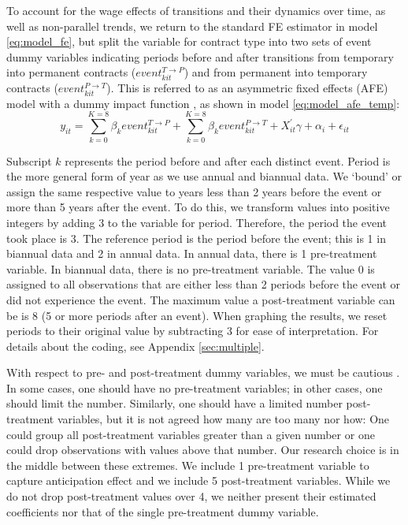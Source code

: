 \documentclass[12pt]{article}
\begin{document}
To account for the wage effects of transitions and their dynamics over time, as well as non-parallel trends, we return to the standard FE estimator in model \ref{eq:model_fe}, but split the variable for contract type into two sets of event dummy variables indicating periods before and after transitions from temporary into permanent contracts ($event^{T \rightarrow P}_{kit}$) and from permanent into temporary contracts ($event^{P \rightarrow T}_{kit}$).  This is referred to as an asymmetric fixed effects (AFE) model with a dummy impact function \citep{allison_asymmetric_2019,andres_applied_2013,ludwig_what_2021}, as shown in model \ref{eq:model_afe_temp}: 
\begin{equation}
    y_{it} = \sum^{K=8}_{k=0} \beta_k event^{T \rightarrow P}_{kit} + \sum^{K=8}_{k=0} \beta_k event^{P \rightarrow T}_{kit} + X^\prime_{it} \gamma + \alpha_i + \epsilon_{it}     
    \label{eq:model_afe_temp} 
\end{equation}

Subscript $k$ represents the period before and after each distinct event.  Period is the more general form of year as we use annual and biannual data.  We `bound' or assign the same respective value to years less than 2 years before the event or more than 5 years after the event.  To do this, we transform values into positive integers by adding 3 to the variable for period.  Therefore, the period the event took place is 3.  The reference period is the period before the event; this is 1 in biannual data and 2 in annual data.  In annual data, there is 1 pre-treatment variable.  In biannual data, there is no pre-treatment variable.  The value 0 is assigned to all observations that are either less than 2 periods before the event or did not experience the event.  The maximum value a post-treatment variable can be is 8 (5 or more periods after an event).  When graphing the results, we reset periods to their original value by subtracting 3 for ease of interpretation.  For details about the coding, see Appendix \ref{sec:multiple}.  

With respect to pre- and post-treatment dummy variables, we must be cautious \citep{ludwig_is_2018,ludwig_what_2021}.  In some cases, one should have no pre-treatment variables; in other cases, one should limit the number.    Similarly, one should have a limited number post-treatment variables, but it is not agreed how many are too many nor how: One could group all post-treatment variables greater than a given number or one could drop observations with values above that number.  Our research choice is in the middle between these extremes.  We include 1 pre-treatment variable to capture anticipation effect and we include 5 post-treatment variables.  While we do not drop post-treatment values over 4, we neither present their estimated coefficients nor that of the single pre-treatment dummy variable.  
\end{document}
